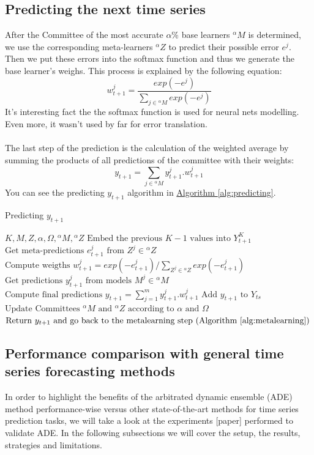 \documentclass[runningheads,a4paper]{llncs}[2015/06/24]
\begin{document}
\subsection{Predicting the next time series}
 After the Committee of the most accurate $\alpha$\% base learners ${}^{\alpha}M$  is determined, we use the corresponding meta-learners ${}^{\alpha}Z$ to predict their possible error $e^j$. Then we put these errors into the softmax function and thus we generate the base learner's weighs\cite{VtorCerqueira2017}. This process is explained by the following equation:
 \begin{equation}
w^{j}_{t+1} = \frac{exp(-e^{j})}{\sum_{j \in {}^{\alpha}M} exp(-e^{j})}
\end{equation} It's interesting fact the the softmax function is used for neural nets modelling. Even more, it wasn't used by far for error translation.\\\\ The last step of the prediction is the calculation of the weighted average by summing the products of all predictions of the committee with their weights:
 \begin{equation}
y_{t+1} = \sum_{j \in {}^{\alpha}M} y^{j}_{t+1}.w^{j}_{t+1}
\end{equation}You can see the predicting $y_{t+1}$ algorithm in \hyperref[alg:predicting]{Algorithm  \ref{alg:predicting}}.


\begin{algorithm}[h]
\caption{Predicting $y_{t+1}$}
\label{alg:predicting}
\begin{algorithmic}[1]
\Require $K, M, Z,\alpha, \Omega, {}^{\alpha}M, {}^{\alpha}Z$
\State $\text{Embed the previous $K-1$ values  into $Y_{t+1}^{K}$}$
\State $\text{Get meta-predictions $e^{j}_{t+1}$ from $Z^{j} \in {}^{\alpha}Z$}$
\State $\text{Compute weigths $w^{j}_{t+1} =  exp(-e^{j}_{t+1})/\sum_{Z^{j} \in {}^{\alpha}Z} exp(-e^{j}_{t+1})$}$
\State $\text{Get predictions $y^{j}_{t+1} $ from models $M^{j} \in {}^{\alpha}M$}$
\State $\text{Compute final predictions $y_{t+1} = \sum_{j=1}^{m} y^{j}_{t+1}.w^{j}_{t+1}$}$
\State $\text{Add $y_{t+1}$ to $Y_{ts}$}$
\State $\text{Update Committees ${}^{\alpha}M$ and ${}^{\alpha}Z$ according to $\alpha$ and $\Omega$}$
\State $\text{Return $y_{t+1}$ and go back to the metalearning step (Algorithm \ref{alg:metalearning})}$
\end{algorithmic}
\end{algorithm}

\subsection{Performance comparison with general time series forecasting methods}
In order to highlight the benefits of the arbitrated dynamic ensemble (ADE) method performance-wise versus other state-of-the-art methods for time series prediction tasks, we will take a look at the experiments [paper] performed to validate ADE. In the following subsections we will cover the setup, the results, strategies and limitations.
\end{document}
